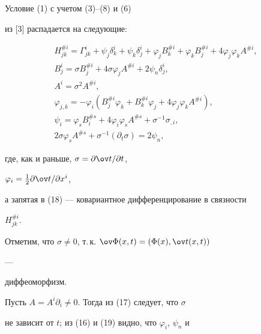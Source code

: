 \begin{pf} 


Условие (1) с учетом (3)--(8) и (6) 


из [3] распадается на следующие: 


\begin{gather} 


H^{\# i}_{j k}=\Gamma^i_{j k}+\psi_j\delta^i_k+ 


\psi_k \delta^i_j+\varphi_j B^{\# i}_k+\varphi_k B^{\# i}_j+ 


4\varphi_j\varphi_k A^{\# i},\\ 


% 


B^i_j=\sigma B^{\# i}_j+4\sigma\varphi_j A^{\# i}+ 


2\psi_n\delta^i_j,\\ 


% 


A^i=\sigma^2 A^{\# i},\\ 


% 


\varphi_{j,k}=-\varphi_i(B^{\# i}_j\varphi_k+B^{\# i}_k 


\varphi_j+4\varphi_j\varphi_k A^{\# i}),\\ 


% 


\psi_i=\varphi_s B^{\# s}_i+4\varphi_i\varphi_s 


A^{\# s}+\sigma^{-1}\sigma_{,i},\\ 


% 


2\sigma\varphi_s A^{\# s}+\sigma^{-1}(\partial_t\sigma)=2\psi_n,


\end{gather} 


где, как и раньше, $\sigma=\partial\ov t/\partial t$, 


$\varphi_i=\frac{1}{2}\partial\ov t/\partial x^i$, 


а запятая в (18) --- ковариантное дифференцирование в связности 


$H^{\# i}_{j k}$. 


Отметим, что $\sigma\ne0$, т.\,к. $\ov\Phi(x,t)=(\Phi(x),\ov t(x,t))$ 


--- 


диффеоморфизм. 


Пусть $A=A^i\partial_i\ne0$. Тогда из (17) следует, что $\sigma$ 


не зависит от $t$; из (16) и (19) видно, что $\varphi_i$, $\psi_n$ и 



\end{pf}
